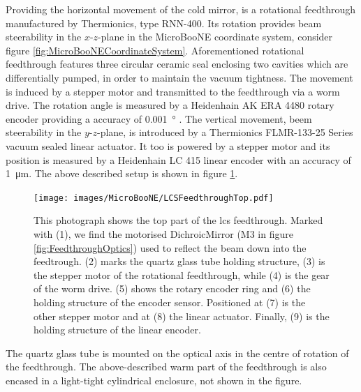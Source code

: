 Providing the horizontal movement of the cold mirror, is a rotational feedthrough manufactured by Thermionics, type RNN-400. Its rotation provides beam steerability in the $x$-$z$-plane in the MicroBooNE coordinate system, consider figure \ref{fig:MicroBooNECoordinateSystem}. Aforementioned rotational feedthrough features three circular ceramic seal enclosing two cavities which are differentially pumped, in order to maintain the vacuum tightness. The movement is induced by a stepper motor and transmitted to the feedthrough via a worm drive. The rotation angle is measured by a Heidenhain AK ERA 4480 rotary encoder providing a accuracy of \SI{0.001}{\degree} \cite{LArLaserPhDMatthias}. The vertical movement, \ie beem steerability in the $y$-$z$-plane, is introduced by a Thermionics FLMR-133-25 Series vacuum sealed linear actuator. It too is powered by a stepper motor and its position is measured by a Heidenhain LC 415 linear encoder with an accuracy of \SI{1}{\micro\metre}. The above described setup is shown in figure \ref{fig:FeedthroughHead}.
\begin{figure}[htbp]
    \centering
    \texttt{[image: images/MicroBooNE/LCSFeedthroughTop.pdf]}     
    \caption[LCS Feedthrough Top]{This photograph shows the top part of the \gls{lcs} feedthrough. Marked with (1), we find the motorised \gls{DichroicMirror} (M3 in figure \ref{fig:FeedthroughOptics}) used to reflect the beam down into the feedtrough. (2) marks the quartz glass tube holding structure, (3) is the stepper motor of the rotational feedthrough, while (4) is the gear of the worm drive. (5) shows the rotary encoder ring and (6) the holding structure of the encoder sensor. Positioned at (7) is the other stepper motor and at (8) the linear actuator. Finally, (9) is the holding structure of the linear encoder.}
    \label{fig:FeedthroughHead}
\end{figure}
The quartz glass tube is mounted on the optical axis in the centre of rotation of the feedthrough. The above-described warm part of the feedthrough is also encased in a light-tight cylindrical enclosure, not shown in the figure.

